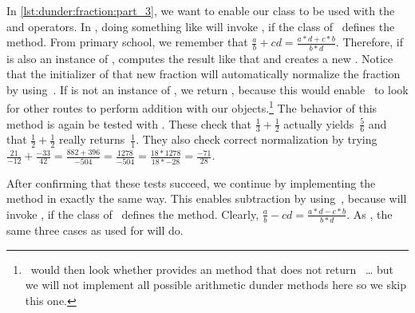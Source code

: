 %
%
%
%
%
%
\afterpage{\clearpage}

In \cref{lst:dunder:fraction:part_3}, we want to enable our  class to be used with the \pythonil{+} and \pythonil{-} operators.
In \python, doing something like  will invoke , if the class of~ defines the  method.
From primary school, we remember that $\frac{a}{b}+{c}{d} = \frac{a*d+c*b}{b*d}$.
Therefore, if  is also an instance of ,  computes the result like that and creates a new .
Notice that the initializer of that new fraction will automatically normalize the fraction by using~.
If  is not an instance of , we return , because this would enable \python\ to look for other routes to perform addition with our objects.\footnote{%
\python\ would then look whether  provides an  method that does not return~ {\dots} but we will not implement all possible arithmetic dunder methods here so we skip this one.%
}%
The behavior of this method is again be tested with .
These check that $\frac{1}{3} + \frac{1}{2}$ actually yields~$\frac{5}{6}$ and that $\frac{1}{2}+\frac{1}{2}$ really returns~$\frac{1}{1}$.
They also check correct normalization by trying~$\frac{21}{-12}+\frac{-33}{42}=\frac{882+396}{-504}=\frac{1278}{-504}=\frac{18*1278}{18*-28}=\frac{-71}{28}$.

After confirming that these tests succeed, we continue by implementing the  method in exactly the same way.
This enables subtraction by using~\pythonilIdx{-}, because  will invoke , if the class of~ defines the  method.
Clearly, $\frac{a}{b}-{c}{d} = \frac{a*d-c*b}{b*d}$.
As , the same three cases as used for  will do.

